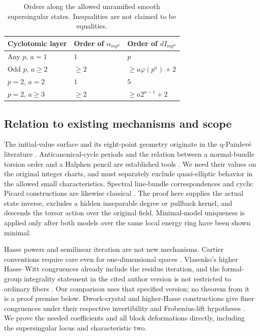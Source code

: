 \begin{table}[htbp]
 \centering
 \begin{tabular}{lll}
  \toprule
  Cyclotomic layer & Order of $\alpha_{mp^a}$ & Order of $dI_{mp^a}$\\
  \midrule
  Any $p$, $a=1$ & $1$ & $p$\\
  Odd $p$, $a\ge2$ & $\ge2$ & $\ge a\varphi(p^a)+2$\\
  $p=2$, $a=2$ & $1$ & $5$\\
  $p=2$, $a\ge3$ & $\ge2$ & $\ge a2^{a-1}+2$\\
  \bottomrule
 \end{tabular}
 \caption{Orders along the allowed unramified smooth supersingular
 states. Inequalities are not claimed to be equalities.}
 \label{main:state-orders}
\end{table}

\subsection{Relation to existing mechanisms and scope}

The initial-value surface and its eight-point geometry originate in
the q-Painlev\'e literature \cite{JoshiLobb2016,JoshiRoffelsen2026}.
Anticanonical-cycle periods and the relation between a normal-bundle
torsion order and a Halphen pencil are established tools
\cite{GrossHackingKeel2015,CantatDolgachev2012}. We need their values
on the original integer charts, and must separately exclude
quasi-elliptic behavior in the allowed small characteristics.
Spectral line-bundle correspondences and cyclic Picard constructions
are likewise classical \cite{Beauville1990,InoueVanhaeckeYamazaki2015}.
The proof here supplies the actual state inverse, excludes a hidden
inseparable degree or pullback kernel, and descends the torsor action
over the original field. Minimal-model uniqueness
\cite[Tags 0C6B and 0C9Z]{StacksProject2026} is applied only after
both models over the same local energy ring have been shown minimal.

Hasse powers and semilinear iteration are not new mechanisms.
Cartier conventions require care even for one-dimensional spaces
\cite{AchterHowe2019}. Vlasenko's higher Hasse--Witt congruences already
include the residue iteration, and the formal-group integrality
statement in the cited author version is not restricted to ordinary
fibers \cite[Theorems 1(i) and 2, author version v3]{Vlasenko2018}.
Our comparison uses that specified version; no theorem from it is a
proof premise below. Dwork-crystal and higher-Hasse constructions
give finer congruences under their respective invertibility and
Frobenius-lift hypotheses \cite{BeukersVlasenko2021,Vlasenko2024}.
We prove the needed coefficients and all block deformations directly,
including the supersingular locus and characteristic two.

